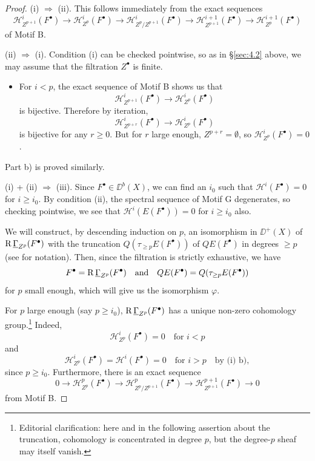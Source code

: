 \begin{proof}
(i) $\Longrightarrow$ (ii). This follows immediately from the exact sequences
\[
\mathcal{H}_{Z^{p+1}}^{i}(F^\bullet)\longrightarrow \mathcal{H}_{Z^{p}}^{i}(F^\bullet)\longrightarrow \mathcal{H}_{Z^{p}/Z^{p+1}}^{i}(F^\bullet)\longrightarrow \mathcal{H}_{Z^{p+1}}^{i+1}(F^\bullet)\longrightarrow \mathcal{H}_{Z^{p}}^{i+1}(F^\bullet)
\]
of Motif B.

(ii) $\Longrightarrow$ (i). Condition (i) can be checked pointwise, so as in \S\ref{sec:4.2} above, we may assume that the filtration $Z^\bullet$ is finite.
\begin{itemize}
\item[a)] For $i<p$, the exact sequence of Motif B shows us that
\[
\mathcal{H}_{Z^{p+1}}^{i}(F^\bullet)\longrightarrow \mathcal{H}_{Z^{p}}^{i}(F^\bullet)
\]
is bijective. Therefore by iteration,
\[
\mathcal{H}_{Z^{p+r}}^{i}(F^\bullet)\longrightarrow \mathcal{H}_{Z^{p}}^{i}(F^\bullet)
\]
is bijective for any $r\geq 0$. But for $r$ large enough, $Z^{p+r}=\emptyset$, so $\mathcal{H}_{Z^{p}}^{i}(F^\bullet)=0$.
\end{itemize}
Part b) is proved similarly.

(i) + (ii) $\Longrightarrow$ (iii). Since $F^\bullet\in\DD^b(X)$, we can find an $i_0$ such that $\mathcal{H}^{i}(F^\bullet)=0$ for $i\geq i_0$. By condition (ii), the spectral sequence of Motif G degenerates, so checking pointwise, we see that $\mathcal{H}^{i}(E(F^\bullet))=0$ for $i\geq i_0$ also.

We will construct, by descending induction on $p$, an isomorphism in $\DD^+(X)$ of $\operatorname{R}\underline{\Gamma}_{Z^p}(F^\bullet)$ with the truncation $Q(\tau_{\geq p}E(F^\bullet))$ of $QE(F^\bullet)$ in degrees $\geq p$ (see  for notation). Then, since the filtration is strictly exhaustive, we have
\[
F^\bullet = \operatorname{R}\underline{\Gamma}_{Z^p}(F^\bullet)\quad\text{and}\quad QE(F^\bullet)=Q(\tau_{\geq p}E(F^\bullet))
\]
for $p$ small enough, which will give us the isomorphism $\varphi$.

For $p$ large enough (say $p\geq i_0$), $\operatorname{R}\underline{\Gamma}_{Z^p}(F^\bullet)$ has a unique non-zero cohomology group.\footnote{Editorial clarification: here and in the following assertion about the truncation, cohomology is concentrated in degree $p$, but the degree-$p$ sheaf may itself vanish.} Indeed,
\[
\mathcal{H}_{Z^{p}}^{i}(F^\bullet)=0\quad\text{for }i<p
\]
and
\[
\mathcal{H}_{Z^{p}}^{i}(F^\bullet)=\mathcal{H}^{i}(F^\bullet)=0\quad\text{for } i>p \quad\text{by (i) b)},
\]
since $p\geq i_0$. Furthermore, there is an exact sequence
\begin{equation}\tag{1}\label{eq:4.3.1}
0\longrightarrow \mathcal{H}_{Z^{p}}^{p}(F^\bullet)\longrightarrow \mathcal{H}_{Z^{p}/Z^{p+1}}^{p}(F^\bullet)\longrightarrow \mathcal{H}_{Z^{p+1}}^{p+1}(F^\bullet)\longrightarrow 0
\end{equation}
from Motif B.


\end{proof}
